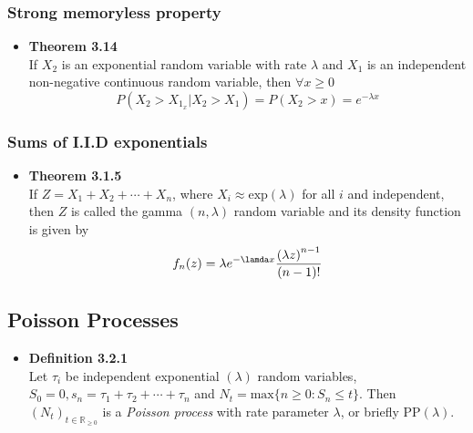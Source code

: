 \documentclass[11pt,a4paper]{article}
\begin{document}
\subsubsection{Strong memoryless property}

\begin{itemize}

    \item \textbf{Theorem 3.14} \\
        If $X_2$ is an exponential random variable with rate $\lambda$ and $X_1$
        is an independent non-negative continuous random variable, then $\forall x \geq 0$
        \[
            P(X_2 > X_1 _ x | X_2 > X_1) = P(X_2 > x) = e^{-\lambda x}
        \]

\end{itemize}

\subsubsection{Sums of I.I.D exponentials}

\begin{itemize}

    \item \textbf{Theorem 3.1.5} \\
        If $Z = X_1 + X_2 + \cdots + X_n$, where $X_i \approx \text{exp}(\lambda)$ for all $i$
        and independent, then $Z$ is called the gamma $(n, \lambda)$ random variable and its
        density function is given by
        \[
            f_n(z) = \lambda e^{-\lamda x} \frac{{(\lambda z)}^{n-1}}{(n-1)!}
        \]
\end{itemize}

\subsection{Poisson Processes}

\begin{itemize}

    \item \textbf{Definition 3.2.1} \\
        Let $\tau_i$ be independent exponential $(\lambda)$ random variables,
        $S_0 = 0, s_n = \tau_1 + \tau_2 + \cdots + \tau_n$ and
        $N_t = \text{max}\{n \geq 0 : S_n \leq t \}$.
        Then ${(N_t)}_{t \in \mathbb{R}_{\geq 0}}$ is a \emph{Poisson process} with rate parameter
        $\lambda$, or briefly PP$(\lambda)$.
\end{itemize}
\end{document}
